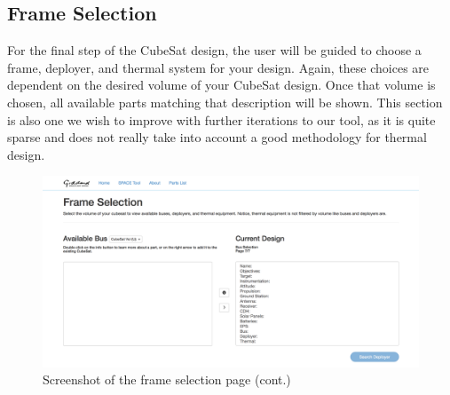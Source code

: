 \documentclass[a4, 12 pt]{article} %
\begin{document}
\subsection{Frame Selection}
For the final step of the CubeSat design, the user will be guided to choose a frame, deployer, and thermal system for your design. Again, these choices are dependent on the desired volume of your CubeSat design. Once that volume is chosen, all available parts matching that description will be shown. This section is also one we wish to improve with further iterations to our tool, as it is quite sparse and does not really take into account a good methodology for thermal design. 
\begin{figure}[H]
\begin{center}
\includegraphics[width=\linewidth]{8}
\caption{Screenshot of the frame selection page (cont.)}
\label{default}
\end{center}
\end{figure}
\end{document}

